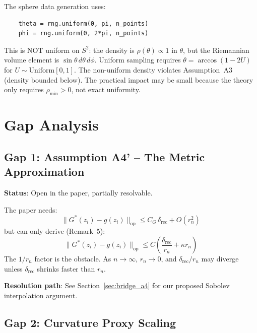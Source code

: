 \documentclass{article}
\DeclareMathOperator{\op}{op}
\begin{document}
\begin{suggestion}
The sphere data generation uses:
\begin{verbatim}
    theta = rng.uniform(0, pi, n_points)
    phi = rng.uniform(0, 2*pi, n_points)
\end{verbatim}
This is NOT uniform on $S^2$: the density is $\rho(\theta) \propto 1$ in
$\theta$, but the Riemannian volume element is $\sin\theta\,d\theta\,d\phi$.
Uniform sampling requires $\theta = \arccos(1 - 2U)$ for $U \sim
\text{Uniform}[0,1]$. The non-uniform density violates Assumption~A3 (density
bounded below). The practical impact may be small because the theory only
requires $\rho_{\min} > 0$, not exact uniformity.
\end{suggestion}


\section{Gap Analysis}
\label{sec:gaps}

\subsection{Gap 1: Assumption A4' -- The Metric Approximation}
\label{sec:a4}

\textbf{Status}: Open in the paper, partially resolvable.

\medskip
The paper needs:
\begin{equation}\label{eq:a4}
    \|G^*(z_i) - g(z_i)\|_{\op} \leq C_G\,\delta_{\mathrm{rec}} + O(r_n^2)
\end{equation}
but can only derive (Remark~5):
\begin{equation}\label{eq:a4_derived}
    \|G^*(z_i) - g(z_i)\|_{\op} \leq C\!\left(\frac{\delta_{\mathrm{rec}}}{r_n}
    + \kappa r_n\right)
\end{equation}
The $1/r_n$ factor is the obstacle. As $n \to \infty$, $r_n \to 0$, and
$\delta_{\mathrm{rec}}/r_n$ may diverge unless $\delta_{\mathrm{rec}}$ shrinks
faster than $r_n$.

\textbf{Resolution path}: See Section~\ref{sec:bridge_a4} for our proposed
Sobolev interpolation argument.

\subsection{Gap 2: Curvature Proxy Scaling}
\label{sec:kappa}
\end{document}
